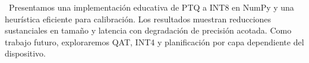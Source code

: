\
        Presentamos una implementación educativa de PTQ a INT8 en NumPy y una heurística eficiente para
        calibración. Los resultados muestran reducciones sustanciales en tamaño y latencia con degradación
        de precisión acotada. Como trabajo futuro, exploraremos QAT, INT4 y planificación por capa dependiente
        del dispositivo.
